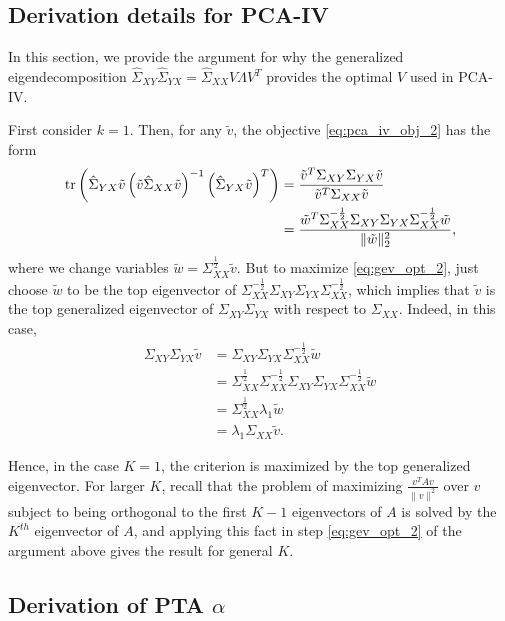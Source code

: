 \documentclass[14pt]{extarticle}
\begin{document}
\subsection{Derivation details for PCA-IV}
\label{subsec:pca_iv_derivation}

In this section, we provide the argument for why the generalized
eigendecomposition $\hat{\Sigma}_{XY}\hat{\Sigma}_{YX} =
\hat{\Sigma}_{XX}V\Lambda V^{T}$ provides the optimal $V$ used in PCA-IV.

First consider $k = 1$. Then, for any $\tilde{v}$, the objective
\ref{eq:pca_iv_obj_2} has the form
\begin{align}
  \mathop\mathrm{tr}\left(\hat{\Sigma}_{YX}\tilde{v}\left(\tilde{v}\hat{\Sigma}_{XX}\tilde{v}\right)^{-1}
  \left(\hat{\Sigma}_{YX}\tilde{v}\right)^{T}\right) &=
  \frac{\tilde{v}^{T}\Sigma_{XY}\Sigma_{YX}\tilde{v}}{\tilde{v}^{T}\Sigma_{XX}\tilde{v}} \label{eq:gev_opt_1}\\
  &= \frac{\tilde{w}^{T}\Sigma_{XX}^{-\frac{1}{2}}\Sigma_{XY}\Sigma_{YX}\Sigma_{XX}^{-\frac{1}{2}}\tilde{w}}{\|\tilde{w}\|_{2}^{2}}, \label{eq:gev_opt_2}
\end{align}
where we change variables $\tilde{w} = \Sigma_{XX}^{\frac{1}{2}}\tilde{v}$. But
to maximize \ref{eq:gev_opt_2}, just choose $\tilde{w}$ to be the top
eigenvector of
$\Sigma_{XX}^{-\frac{1}{2}}\Sigma_{XY}\Sigma_{YX}\Sigma_{XX}^{-\frac{1}{2}}$,
which implies that $\tilde{v}$ is the top generalized eigenvector of
$\Sigma_{XY}\Sigma_{YX}$ with respect to $\Sigma_{XX}$. Indeed, in this case,
\begin{align*}
  \Sigma_{XY}\Sigma_{YX}\tilde{v}
  &=\Sigma_{XY}\Sigma_{YX}\Sigma_{XX}^{-\frac{1}{2}}\tilde{w} \\
  &= \Sigma_{XX}^{\frac{1}{2}} \Sigma_{XX}^{-\frac{1}{2}}\Sigma_{XY}\Sigma_{YX} \Sigma_{XX}^{-\frac{1}{2}}\tilde{w}\\
  &= \Sigma_{XX}^{\frac{1}{2}}\lambda_{1}\tilde{w} \\
  &= \lambda_{1}\Sigma_{XX}\tilde{v}.
\end{align*}

Hence, in the case $K = 1$, the criterion is maximized by the top generalized
eigenvector. For larger $K$, recall that the problem of maximizing
$\frac{v^{T}Av}{\|v\|^{2}}$ over $v$ subject to being orthogonal to the first $K
- 1$ eigenvectors of $A$ is solved by the $K^{th}$ eigenvector of $A$, and
applying this fact in step \ref{eq:gev_opt_2} of the argument above gives the
result for general $K$.

\subsection{Derivation of PTA $\alpha$}
\label{subsec:pta_alpha_derivation}
\end{document}
